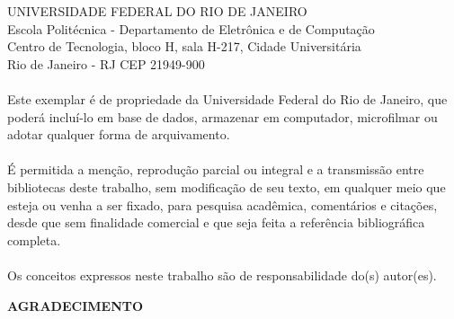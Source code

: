       \vspace{0.4cm}
      \begin{flushright}
         \parbox{10cm}{
            \hrulefill

            \vspace{-.375cm}

            \vspace{0.1cm}
         }
      \end{flushright}
      
\pagebreak

      \vspace{0.5cm}

UNIVERSIDADE FEDERAL DO RIO DE JANEIRO \\
Escola Politécnica - Departamento de Eletrônica e de Computação \\
Centro de Tecnologia, bloco H, sala H-217, Cidade Universitária \\ 
Rio de Janeiro - RJ      CEP 21949-900\\
\vspace{0.5cm}
\paragraph{}Este exemplar é de propriedade da Universidade Federal do Rio de Janeiro, que poderá incluí-lo em base de dados, armazenar em computador, microfilmar ou adotar qualquer forma de arquivamento.
\paragraph{}É permitida a menção, reprodução parcial ou integral e a transmissão entre bibliotecas deste trabalho, sem modificação de seu texto, em qualquer meio que esteja ou venha a ser fixado, para pesquisa acadêmica, comentários e citações, desde que sem finalidade comercial e que seja feita a referência bibliográfica completa.
\paragraph{}Os conceitos expressos neste trabalho são de responsabilidade do(s) autor(es).

\pagebreak


\begin{center}
\textbf{AGRADECIMENTO}
\end{center}
      \vspace{0.5cm}

